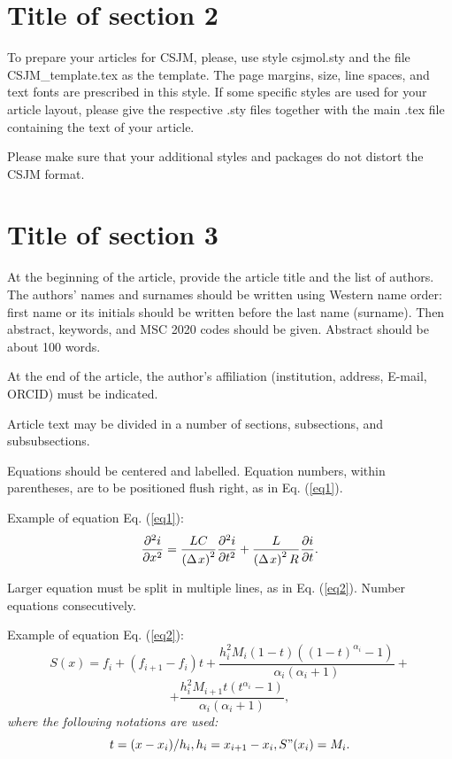 \documentclass[11pt,a5paper,twoside]{article}
\begin{document}
\section{Title of section 2}\label{sect2}
To prepare your articles for CSJM, please, use style csjmol.sty and the file CSJM\_template.tex as the template. The page margins, size, line spaces, and text fonts are prescribed in this style. If some specific styles are used for your article layout, please give the respective .sty files together with the main .tex file containing the text of your article. 

Please make sure that your additional styles and packages do not distort the CSJM format.

\section{Title of section 3}\label{sect3}
At the beginning of the article, provide the article title and the list of authors. The authors' names and surnames should be written using Western name order: first name or its initials should be written before the last name (surname). Then abstract, keywords, and MSC 2020 codes should be given. 
Abstract should be about 100 words. 

At the end of the article, the author’s affiliation (institution, address, E-mail, ORCID) must be indicated.

Article text may be divided in a number of sections, subsections, and subsubsections. 

Equations should be centered and labelled. Equation numbers, within 
parentheses, are to be positioned flush right, as in Eq. (\ref{eq1}).

\medskip
\noindent Example of equation Eq. (\ref{eq1}):
\begin{equation}
\label{eq1}
\frac{\partial ^2i}{\partial x^2}=\frac{LC}{\left( {\Delta {\kern 1pt}x} 
	\right)^2}\frac{\partial ^2i}{\partial t^2}+\frac{L}{\left( {\Delta {\kern 
			1pt}x} \right)^2R}\frac{\partial i}{\partial t}.
\end{equation}

Larger equation must be split in multiple lines, as in Eq. (\ref{eq2}). Number equations consecutively.

\medskip
\noindent Example of equation Eq. (\ref{eq2}):
\[
S(x)=f_i +(f_{i+1} -f_i )t+\frac{h_i^2 M_i (1-t)((1-t)^{\alpha _i 
	}-1)}{\alpha _i (\alpha _i +1)}+
\]
\begin{equation}
\label{eq2}
+\frac{h_i^2 M_{i+1} t(t^{\alpha _i }-1)}{\alpha _i (\alpha _i +1)},
\end{equation}
\textit{where the following notations are used:}
\[
t=(x-x_i )/h_i ,h_i =x_{i+1} -x_i ,S"(x_i )=M_i .
\]
\end{document}
